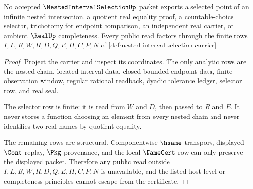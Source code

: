 \begin{theorem}
\label{thm:nested-interval-selection-nonescape}
No accepted $\NestedIntervalSelectionUp$ packet exports a selected point of an infinite nested intersection, a quotient real equality proof, a countable-choice selector, trichotomy for endpoint comparison, an independent real carrier, or ambient $\RealUp$ completeness. Every public read factors through the finite rows $I,L,B,W,R,D,Q,E,H,C,P,N$ of \autoref{def:nested-interval-selection-carrier}.
\end{theorem}
\begin{proof}
Project the carrier and inspect its coordinates. The only analytic rows are the nested chain, located interval data, closed bounded endpoint data, finite observation window, regular rational readback, dyadic tolerance ledger, selector row, and real seal.

The selector row is finite: it is read from $W$ and $D$, then passed to $R$ and $E$. It never stores a function choosing an element from every nested chain and never identifies two real names by quotient equality.

The remaining rows are structural. Componentwise $\hsame$ transport, displayed $\Cont$ replay, $\Pkg$ provenance, and the local $\NameCert$ row can only preserve the displayed packet. Therefore any public read outside $I,L,B,W,R,D,Q,E,H,C,P,N$ is unavailable, and the listed host-level or completeness principles cannot escape from the certificate.
\end{proof}




